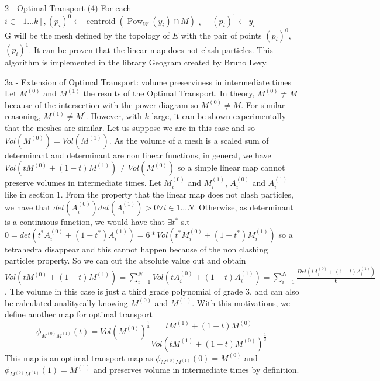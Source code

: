 \documentclass[b0paper,portrait]{baposter}
\begin{document}
\begin{poster}
\begin{posterbox}[name=otm,below=volume,span=6,column=0]{2
    - Optimal Transport }
(4) For each $i \in[1 \ldots k],\left(p_{i}\right)^{0} \leftarrow \operatorname{centroid}\left(\operatorname{Pow}_{W}\left(y_{i}\right) \cap M\right) $ , $\quad\left(p_{i}\right)^{1} \leftarrow y_{i}$\\
G will be the mesh defined by the topology of $E$ with the pair of points $(p_{i})^{0}$,$(p_{i})^{1}$.
It can be proven that the linear map does not clash particles. This algorithm is implemented in the library Geogram created by Bruno Levy.
\end{posterbox}
\begin{posterbox}[name=otm2,below=otm,span=6,column=0]{3a
    - Extension of Optimal Transport: volume preserviness in intermediate times }
Let $M^{(0)}$ and $M^{(1)}$ the results of the Optimal Transport. In theory, $M^{(0)}\neq M$ because of the intersection with the power diagram so $M^{(0)}\neq M$. For similar reasoning, $M^{(1)}\neq M^{\prime}$. However, with $k$ large, it can be shown experimentally that the meshes are similar. Let us suppose we are in this case and so $Vol(M^{(0)})=Vol(M^{(1)})$. As the volume of a mesh is a scaled sum of determinant and determinant are non linear functions, in general, we have $Vol(tM^{(0)}+(1-t)M^{(1)})\neq Vol(M^{(0)})$ so a simple linear map cannot preserve volumes in intermediate times.
Let $M_{i}^{(0)}$ and $M_{i}^{(1)}$, $A_{i}^{(0)}$ and $A_{i}^{(1)}$ like in section 1. From the property that the linear map does not clash particles, we have that $det(A_{i}^{(0)})det(A_{i}^{(1)})>0 \forall i \in 1...N $. Otherwise, as determinant is a continuous function, we would have that $\exists t^{*}$ s.t $0=det(t^{*}A_{i}^{(0)}+(1-t^{*})A_{i}^{(1)})=6*Vol(t^{*}M_{i}^{(0)}+(1-t^{*})M_{i}^{(1)})$ so a tetrahedra disappear and this cannot happen because of the non clashing particles property. So we can cut the absolute value out and obtain $Vol(tM^{(0)}+(1-t)M^{(1)})=\sum \limits_{i=1}^{N} Vol(tA_{i}^{(0)}+(1-t)A_{i}^{(1)})=\sum \limits_{i=1}^{N} \frac{Det(tA_{i}^{(0)}+(1-t)A_{i}^{(1)})}{6}$. The volume in this case is just a third grade polynomial of grade $3$, and can also be calculated analitycally knowing $M^{(0)}$ and $M^{(1)}$.
With this motivations, we define another map for optimal transport $$\phi_{M^{(0)}M^{(1)}} (t)= {Vol(M^{(0)})}^{\frac{1}{3}}\frac{tM^{(1)}+(1-t)M^{(0)}}{Vol(tM^{(1)}+(1-t)M^{(0)})^{\frac{1}{3}}}$$
This map is an optimal transport map as $\phi_{M^{(0)}M^{(1)}}(0)=M^{(0)}$ and $\phi_{M^{(0)}M^{(1)}}(1)=M^{(1)}$ and preserves volume in intermediate times by definition.

\end{posterbox}
\end{poster}
\end{document}
